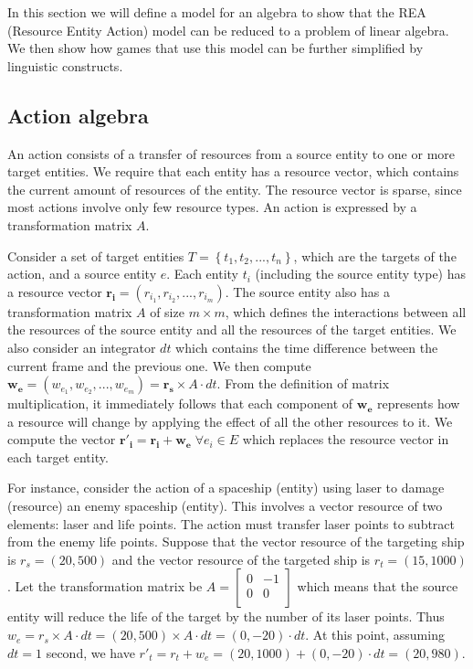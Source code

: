 In this section we will define a model for an algebra to show that the REA (Resource Entity Action) model can be reduced to a problem of linear algebra. We then show how games that use this model can be further simplified by linguistic constructs.

\subsection{Action algebra}

An action consists of a transfer of resources from a source entity to one or more target entities. We require that each entity has a resource vector, which contains the current amount of resources of the entity. The resource vector is sparse, since most actions involve only few resource types. An action is expressed by a transformation matrix $A$.

Consider a set of target entities $T = \left\lbrace t_{1},t_{2},...,t_{n}\right\rbrace$, which are the targets of the action, and a source entity $e$. Each entity $t_{i}$ (including the source entity type) has a resource vector
$\mathbf{r_{i}}=\left(r_{i_{1}},r_{i_{2}},...,r_{i_{m}} \right)$. The source entity also has a transformation matrix $A$ of size $m \times m$, which defines the interactions between all the resources of the source entity and all the resources of the target entities. We also consider an integrator $dt$ which contains the time difference between the current frame and the previous one. We then compute $\mathbf{w_{e}} = \left(  w_{e_{1}},w_{e_{2}},...,w_{e_{m}} \right) = \mathbf{r_{s}} \times A \cdot dt$. From the definition of matrix multiplication, it immediately follows that each component of $ \mathbf{w_{e}}$ represents how a resource will change by applying the effect of all the other resources to it. We compute the vector $\mathbf{r'_{i}} = \mathbf{r_{i}} + \mathbf{w_{e}} \; \forall e_{i} \in E$
which replaces the resource vector in each target entity.

For instance, consider the action of a spaceship (entity) using laser to damage (resource) an enemy spaceship (entity). This involves a  vector resource of two elements: laser and life points. The action must transfer laser points to subtract from the enemy life points. Suppose that the vector resource of the targeting ship is $r_{s} = (20,500)$ and the vector resource of the targeted ship is $r_{t} = (15,1000)$. Let the transformation matrix be
$A =
\begin{bmatrix}
0 & -1\\
0 & 0\\
\end{bmatrix}
$
which means that the source entity will reduce the life of the target by the number of its laser points.
Thus $w_{e} = r_{s} \times A  \cdot dt = (20,500) \times A  \cdot dt = (0,-20) \cdot dt$. At this point, assuming $dt = 1$ second, we have $r'_{t} = r_{t} + w_{e} = (20,1000) + (0,-20) \cdot dt = (20,980)$.

